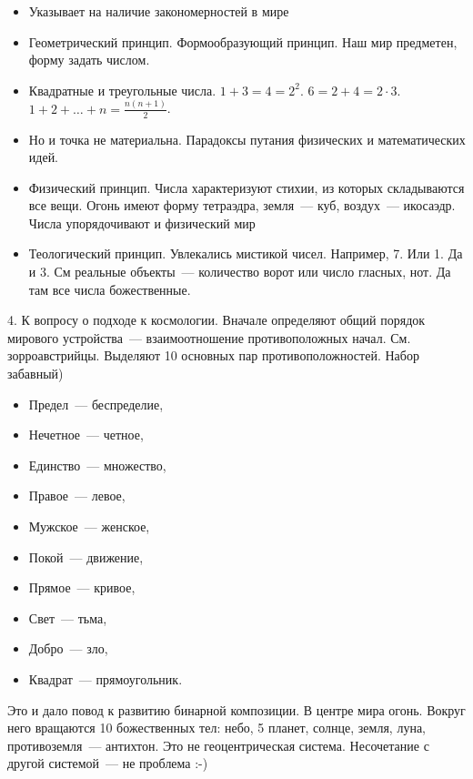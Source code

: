 \begin{itemize}
	\item Указывает на наличие закономерностей в мире
	\item Геометрический принцип. Формообразующий принцип. Наш мир предметен, форму задать числом. 
	\item Квадратные и треугольные числа. $1+3=4=2^2$. $6=2+4=2\cdot3$. $1+2+\ldots+n=\frac{n(n+1)}2$. 
	\item Но и точка не материальна. Парадоксы путания физических и математических идей. 
	\item Физический принцип. Числа характеризуют стихии, из которых складываются все вещи. Огонь имеют форму тетраэдра, земля~--- куб, воздух~--- икосаэдр. Числа упорядочивают и физический мир
	\item Теологический принцип. Увлекались мистикой чисел. Например, 7. Или 1. Да и 3. См реальные объекты~--- количество ворот или число гласных, нот. Да там все числа божественные. 
\end{itemize}

4. К вопросу о подходе к космологии. Вначале определяют общий порядок мирового устройства~--- взаимоотношение противоположных начал. См. зорроавстрийцы. Выделяют 10 основных пар противоположностей. Набор забавный) 
\begin{itemize}
	\item Предел~--- беспределие,
	\item Нечетное~--- четное,
	\item Единство~--- множество,
	\item Правое~--- левое,
	\item Мужское~--- женское,
	\item Покой~--- движение,
	\item Прямое~--- кривое,
	\item Свет~--- тьма,
	\item Добро~--- зло,
	\item Квадрат~--- прямоугольник. 
\end{itemize}
Это и дало повод к развитию бинарной композиции. 
В центре мира огонь. Вокруг него вращаются 10 божественных тел: небо, 5 планет, солнце, земля, луна, противоземля~--- антихтон. Это не геоцентрическая система. Несочетание с другой системой~--- не проблема :-) 

